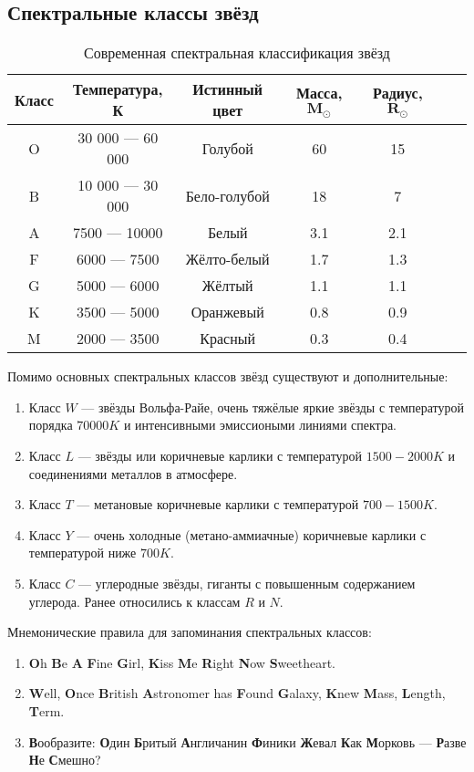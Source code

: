 \subsection{Спектральные классы звёзд}
\begin{center}
\begin{table}[h!]
\begin{tabular}{|c|c|c|c|c|c|c|}
\hline
{\bfseries Класс} & {\bfseries Температура, К} & {\bfseries Истинный цвет} & {\bfseries Масса, $\mathbf{M_{\odot}}$} & {\bfseries Радиус, $\mathbf{R_{\odot}}$}\\
\hline
O & 30 000 --- 60 000 & Голубой & 60 & 15\\
\hline
B & 10 000 --- 30 000 & Бело-голубой & 18 & 7\\
\hline
A & 7500 --- 10000 & Белый & 3.1 & 2.1\\
\hline
F & 6000 --- 7500 & Жёлто-белый & 1.7 & 1.3\\
\hline
G & 5000 --- 6000 & Жёлтый & 1.1 & 1.1\\
\hline 
K & 3500 --- 5000 & Оранжевый & 0.8 & 0.9\\
\hline
M & 2000 --- 3500 & Красный & 0.3 & 0.4\\
\hline
\end{tabular}
\caption{Современная спектральная классификация звёзд}
\end{table}
\end{center}

Помимо основных спектральных классов звёзд существуют и дополнительные:
\begin{enumerate}
\item Класс $W$ --- звёзды Вольфа-Райе, очень тяжёлые яркие звёзды с температурой порядка $70000 K$ и интенсивными эмиссиоными линиями спектра.
\item Класс $L$ --- звёзды или коричневые карлики с температурой $1500 - 2000K$ и соединениями металлов в атмосфере.
\item Класс $T$ --- метановые коричневые карлики с температурой $700 - 1500K$.
\item Класс $Y$ ---  очень холодные (метано-аммиачные) коричневые карлики с температурой ниже $700 K$.
\item Класс $C$ --- углеродные звёзды, гиганты с повышенным содержанием углерода. Ранее относились к классам $R$ и $N$.
\end{enumerate}

Мнемонические правила для запоминания спектральных классов:
\begin{enumerate}
\item\textbf{O}h \textbf{B}e \textbf{A} \textbf{F}ine \textbf{G}irl, \textbf{K}iss \textbf{M}e \textbf{R}ight \textbf{N}ow \textbf{S}weetheart.
\item\textbf{W}ell, \textbf{O}nce \textbf{B}ritish \textbf{A}stronomer has \textbf{F}ound \textbf{G}alaxy, \textbf{K}new \textbf{M}ass, \textbf{L}ength, \textbf{T}erm.
\item \textbf{В}ообразите: \textbf{О}дин \textbf{Б}ритый \textbf{А}нгличанин \textbf{Ф}иники \textbf{Ж}евал \textbf{К}ак \textbf{М}орковь --- \textbf{Р}азве \textbf{Н}е \textbf{С}мешно?
\end{enumerate}


